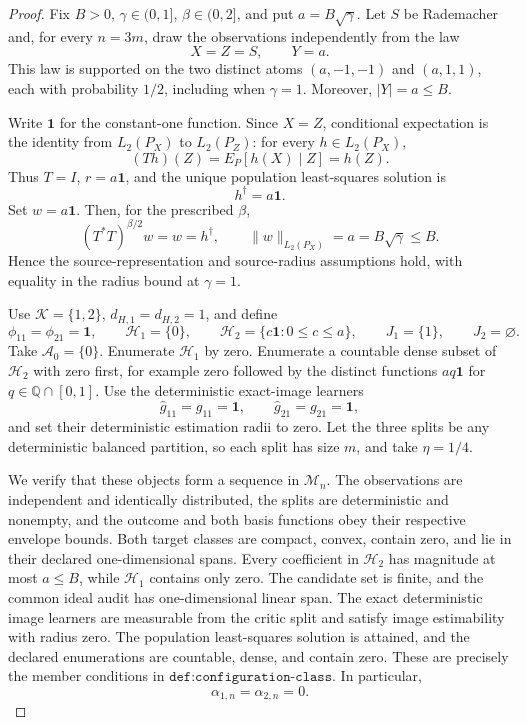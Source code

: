 \begin{proof}
Fix \(B>0\), \(\gamma\in(0,1]\), \(\beta\in(0,2]\), and put \(a=B\sqrt{\gamma}\). Let \(S\) be Rademacher and, for every \(n=3m\), draw the observations independently from the law
\[
 X=Z=S,\qquad Y=a.
\]
This law is supported on the two distinct atoms \((a,-1,-1)\) and \((a,1,1)\), each with probability \(1/2\), including when \(\gamma=1\). Moreover, \(|Y|=a\le B\).

Write \(\mathbf 1\) for the constant-one function. Since \(X=Z\), conditional expectation is the identity from \(L_2(P_X)\) to \(L_2(P_Z)\): for every \(h\in L_2(P_X)\),
\[
 (Th)(Z)=E_P[h(X)\mid Z]=h(Z).
\]
Thus \(T=I\), \(r=a\mathbf 1\), and the unique population least-squares solution is
\[
 h^\dagger=a\mathbf 1.
\]
Set \(w=a\mathbf 1\). Then, for the prescribed \(\beta\),
\[
 (T^*T)^{\beta/2}w=w=h^\dagger,
 \qquad
 \|w\|_{L_2(P_X)}=a=B\sqrt{\gamma}\le B.
\]
Hence the source-representation and source-radius assumptions hold, with equality in the radius bound at \(\gamma=1\).

Use \(\mathcal K=\{1,2\}\), \(d_{H,1}=d_{H,2}=1\), and define
\[
 \phi_{11}=\phi_{21}=\mathbf 1,
 \qquad
 \mathcal H_1=\{0\},
 \qquad
 \mathcal H_2=\{c\mathbf 1:0\le c\le a\},
 \qquad
 J_1=\{1\},
 \qquad
 J_2=\varnothing.
\]
Take \(\mathcal A_0=\{0\}\). Enumerate \(\mathcal H_1\) by zero. Enumerate a countable dense subset of \(\mathcal H_2\) with zero first, for example zero followed by the distinct functions \(aq\mathbf 1\) for \(q\in\mathbb Q\cap[0,1]\). Use the deterministic exact-image learners
\[
 \widehat g_{11}=g_{11}=\mathbf 1,
 \qquad
 \widehat g_{21}=g_{21}=\mathbf 1,
\]
and set their deterministic estimation radii to zero. Let the three splits be any deterministic balanced partition, so each split has size \(m\), and take \(\eta=1/4\).

We verify that these objects form a sequence in \(\mathcal M_n\). The observations are independent and identically distributed, the splits are deterministic and nonempty, and the outcome and both basis functions obey their respective envelope bounds. Both target classes are compact, convex, contain zero, and lie in their declared one-dimensional spans. Every coefficient in \(\mathcal H_2\) has magnitude at most \(a\le B\), while \(\mathcal H_1\) contains only zero. The candidate set is finite, and the common ideal audit has one-dimensional linear span. The exact deterministic image learners are measurable from the critic split and satisfy image estimability with radius zero. The population least-squares solution is attained, and the declared enumerations are countable, dense, and contain zero. These are precisely the member conditions in \(\texttt{def:configuration-class}\). In particular,
\[
 \alpha_{1,n}=\alpha_{2,n}=0.
\]


\end{proof}
